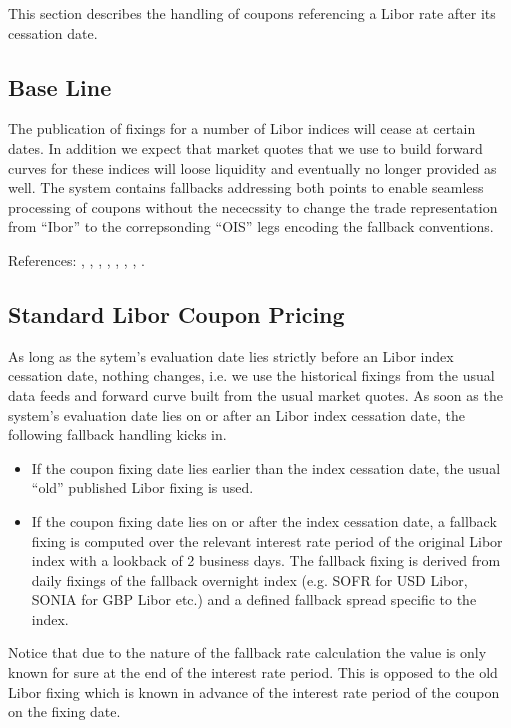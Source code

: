 This section describes the handling of coupons referencing a Libor rate after its cessation date.

\subsection{Base Line}

The publication of fixings for a number of Libor indices will cease at certain dates. In addition we expect that market
quotes that we use to build forward curves for these indices will loose liquidity and eventually no longer provided as
well. The system contains fallbacks addressing both points to enable seamless processing of coupons without the
nececssity to change the trade representation from ``Ibor'' to the correpsonding ``OIS'' legs encoding the fallback
conventions.

References: \cite{isda_entrypoint}, \cite{isda_user_guide}, \cite{isda_product_table}, \cite{bbg_1}, \cite{isda_1},
\cite{fca_1}, \cite{isda_2}, \cite{isda_3}.

\subsection{Standard Libor Coupon Pricing}

As long as the sytem's evaluation date lies strictly before an Libor index cessation date, nothing changes, i.e. we use
the historical fixings from the usual data feeds and forward curve built from the usual market quotes. As soon as the
system's evaluation date lies on or after an Libor index cessation date, the following fallback handling kicks in.

\begin{itemize}
\item If the coupon fixing date lies earlier than the index cessation date, the usual ``old'' published Libor fixing is
  used.
\item If the coupon fixing date lies on or after the index cessation date, a fallback fixing is computed over the
  relevant interest rate period of the original Libor index with a lookback of 2 business days. The fallback fixing is
  derived from daily fixings of the fallback overnight index (e.g. SOFR for USD Libor, SONIA for GBP Libor etc.) and a
  defined fallback spread specific to the index.
\end{itemize}

Notice that due to the nature of the fallback rate calculation the value is only known for sure at the end of the
interest rate period. This is opposed to the old Libor fixing which is known in advance of the interest rate period of
the coupon on the fixing date.

